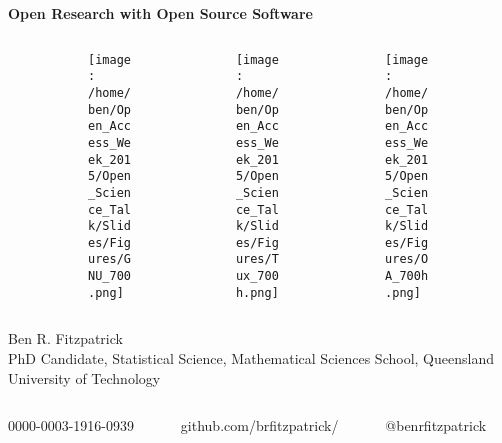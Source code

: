 \documentclass[xcolor=dvipsnames]{beamer}
\begin{document}
\begin{frame} 
\begin{center}
\textbf{\huge Open Research with Open Source Software}\\
\end{center}

\begin{figure}
\begin{columns}

\begin{column}{3.3cm}
\begin{center}
\begin{figure}
\texttt{[image: /home/ben/Open\_Access\_Week\_2015/Open\_Science\_Talk/Slides/Figures/GNU\_700.png]}
\end{figure}
\end{center}
\end{column} 

\begin{column}{3.3cm}
\begin{center}
\begin{figure}
\texttt{[image: /home/ben/Open\_Access\_Week\_2015/Open\_Science\_Talk/Slides/Figures/Tux\_700h.png]}
\end{figure}
\end{center}
\end{column} 

\begin{column}{3.3cm}
\begin{center}
\begin{figure}
\texttt{[image: /home/ben/Open\_Access\_Week\_2015/Open\_Science\_Talk/Slides/Figures/OA\_700h.png]}
\end{figure}
\end{center}
\end{column} 

\end{columns}
\end{figure}

\small Ben R. Fitzpatrick\\
\tiny PhD Candidate, Statistical Science, Mathematical Sciences School, Queensland University of Technology
\newline
\begin{columns}
\begin{column}{3cm}
\tiny 0000-0003-1916-0939
\end{column}
\begin{column}{3cm}
\tiny github.com/brfitzpatrick/
\end{column}
\begin{column}{3cm}
\tiny @benrfitzpatrick
\end{column}
\end{columns}
\end{frame}
\end{document}
